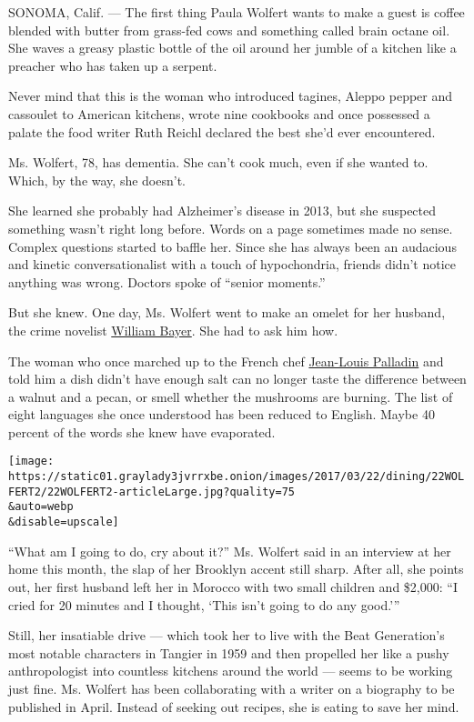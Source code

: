 SONOMA, Calif. --- The first thing Paula Wolfert wants to make a guest
is coffee blended with butter from grass-fed cows and something called
brain octane oil. She waves a greasy plastic bottle of the oil around
her jumble of a kitchen like a preacher who has taken up a serpent.

Never mind that this is the woman who introduced tagines, Aleppo pepper
and cassoulet to American kitchens, wrote nine cookbooks and once
possessed a palate the food writer Ruth Reichl declared the best she'd
ever encountered.

Ms. Wolfert, 78, has dementia. She can't cook much, even if she wanted
to. Which, by the way, she doesn't.

She learned she probably had Alzheimer's disease in 2013, but she
suspected something wasn't right long before. Words on a page sometimes
made no sense. Complex questions started to baffle her. Since she has
always been an audacious and kinetic conversationalist with a touch of
hypochondria, friends didn't notice anything was wrong. Doctors spoke of
``senior moments.''

But she knew. One day, Ms. Wolfert went to make an omelet for her
husband, the crime novelist \href{http://www.williambayer.com/}{William
Bayer}. She had to ask him how.

The woman who once marched up to the French chef
\href{http://www.nytimes3xbfgragh.onion/2001/11/26/us/jean-louis-palladin-55-a-french-chef-with-verve-dies.html}{Jean-Louis
Palladin} and told him a dish didn't have enough salt can no longer
taste the difference between a walnut and a pecan, or smell whether the
mushrooms are burning. The list of eight languages she once understood
has been reduced to English. Maybe 40 percent of the words she knew have
evaporated.

\texttt{[image: https://static01.graylady3jvrrxbe.onion/images/2017/03/22/dining/22WOLFERT2/22WOLFERT2-articleLarge.jpg?quality=75\\\&auto=webp\\\&disable=upscale]}

``What am I going to do, cry about it?'' Ms. Wolfert said in an
interview at her home this month, the slap of her Brooklyn accent still
sharp. After all, she points out, her first husband left her in Morocco
with two small children and \$2,000: ``I cried for 20 minutes and I
thought, `This isn't going to do any good.'''

Still, her insatiable drive --- which took her to live with the Beat
Generation's most notable characters in Tangier in 1959 and then
propelled her like a pushy anthropologist into countless kitchens around
the world --- seems to be working just fine. Ms. Wolfert has been
collaborating with a writer on a biography to be published in April.
Instead of seeking out recipes, she is eating to save her mind.

